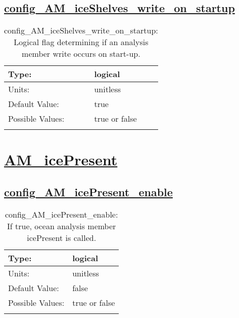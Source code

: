 \subsection[config\_AM\_iceShelves\_write\_on\_startup]{\hyperref[sec:nm_tab_AM_iceShelves]{config\_AM\_iceShelves\_write\_on\_startup}}
\label{subsec:nm_sec_config_AM_iceShelves_write_on_startup}
\begin{center}
\begin{longtable}{| p{2.0in} || p{4.0in} |}
    \hline
    Type: & logical \\
    \hline
    Units: & \si{unitless} \\
    \hline
    Default Value: & true \\
    \hline
    Possible Values: & true or false \\
    \hline
    \caption{config\_AM\_iceShelves\_write\_on\_startup: Logical flag determining if an analysis member write occurs on start-up.}
\end{longtable}
\end{center}
\section[AM\_icePresent]{\hyperref[sec:nm_tab_AM_icePresent]{AM\_icePresent}}
\label{sec:nm_sec_AM_icePresent}
\subsection[config\_AM\_icePresent\_enable]{\hyperref[sec:nm_tab_AM_icePresent]{config\_AM\_icePresent\_enable}}
\label{subsec:nm_sec_config_AM_icePresent_enable}
\begin{center}
\begin{longtable}{| p{2.0in} || p{4.0in} |}
    \hline
    Type: & logical \\
    \hline
    Units: & \si{unitless} \\
    \hline
    Default Value: & false \\
    \hline
    Possible Values: & true or false \\
    \hline
    \caption{config\_AM\_icePresent\_enable: If true, ocean analysis member icePresent is called.}
\end{longtable}
\end{center}
